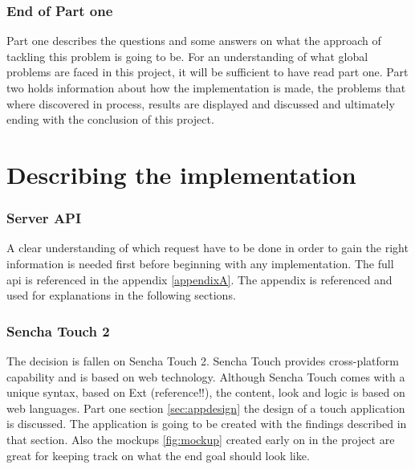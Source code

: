 
\section*{End of Part one}
Part one describes the questions and some answers on what the approach of tackling this problem is going to be. For an understanding of what global problems are faced in this project, it will be sufficient to have read part one. Part two holds information about how the implementation is made, the problems that where discovered in process, results are displayed and discussed and ultimately ending with the conclusion of this project. 

\part{Describing the implementation}

\section{Server API}
A clear understanding of which request have to be done in order to gain the right information is needed first before beginning with any implementation. The full api is referenced in the appendix \ref{appendixA}. The appendix is referenced and used for explanations in the following sections.

\section{Sencha Touch 2}
The decision is fallen on Sencha Touch 2. Sencha Touch provides cross-platform capability and is based on web technology. Although Sencha Touch comes with a unique syntax, based on Ext (reference!!), the content, look and logic is based on web languages.
Part one section \ref{sec:appdesign} the design of a touch application is discussed. The application is going to be created with the findings described in that section. Also the mockups \ref{fig:mockup} created early on in the project are great for keeping track on what the end goal should look like. 

